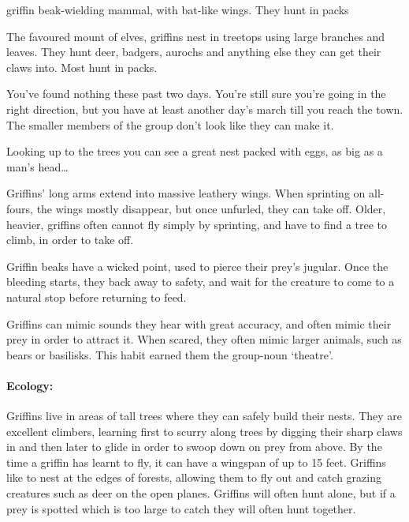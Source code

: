 \begin{multicols}{2}
  {griffin}%
  {beak-wielding mammal, with bat-like wings. They hunt in packs}%

The favoured mount of elves, griffins nest in treetops using large branches and leaves.
They hunt deer, badgers, aurochs and anything else they can get their claws into.
Most hunt in packs.

\begin{boxtext}

  You've found nothing these past two days.
  You're still sure you're going in the right direction, but you have at least another day's march till you reach the town.
  The smaller members of the group don't look like they can make it.

  Looking up to the trees you can see a great nest packed with eggs, as big as a man's head\ldots

\end{boxtext}

Griffins' long arms extend into massive leathery wings.
When sprinting on all-fours, the wings mostly disappear, but once unfurled, they can take off.
Older, heavier, griffins often cannot fly simply by sprinting, and have to find a tree to climb, in order to take off.

Griffin beaks have a wicked point, used to pierce their prey's jugular.
Once the bleeding starts, they back away to safety, and wait for the creature to come to a natural stop before returning to feed.

Griffins can mimic sounds they hear with great accuracy, and often mimic their prey in order to attract it.
When scared, they often mimic larger animals, such as bears or basilisks.
This habit earned them the group-noun `theatre'.


\paragraph{Ecology:} Griffins live in areas of tall trees where they can safely build their nests.
They are excellent climbers, learning first to scurry along trees by digging their sharp claws in and then later to glide in order to swoop down on prey from above.
By the time a griffin has learnt to fly, it can have a wingspan of up to 15 feet.
Griffins like to nest at the edges of forests, allowing them to fly out and catch grazing creatures such as deer on the open planes.
Griffins will often hunt alone, but if a prey is spotted which is too large to catch  they will often hunt together.


\end{multicols}
